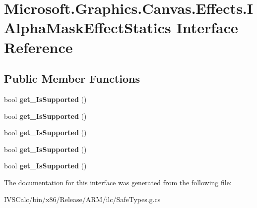\hypertarget{interface_microsoft_1_1_graphics_1_1_canvas_1_1_effects_1_1_i_alpha_mask_effect_statics}{}\section{Microsoft.\+Graphics.\+Canvas.\+Effects.\+I\+Alpha\+Mask\+Effect\+Statics Interface Reference}
\label{interface_microsoft_1_1_graphics_1_1_canvas_1_1_effects_1_1_i_alpha_mask_effect_statics}
\subsection*{Public Member Functions}
\begin{DoxyCompactItemize}
\item 
\mbox{\label{interface_microsoft_1_1_graphics_1_1_canvas_1_1_effects_1_1_i_alpha_mask_effect_statics_acb549089ab206ae7df3adcf359040c3a}} 
bool {\bfseries get\+\_\+\+Is\+Supported} ()
\item 
\mbox{\label{interface_microsoft_1_1_graphics_1_1_canvas_1_1_effects_1_1_i_alpha_mask_effect_statics_acb549089ab206ae7df3adcf359040c3a}} 
bool {\bfseries get\+\_\+\+Is\+Supported} ()
\item 
\mbox{\label{interface_microsoft_1_1_graphics_1_1_canvas_1_1_effects_1_1_i_alpha_mask_effect_statics_acb549089ab206ae7df3adcf359040c3a}} 
bool {\bfseries get\+\_\+\+Is\+Supported} ()
\item 
\mbox{\label{interface_microsoft_1_1_graphics_1_1_canvas_1_1_effects_1_1_i_alpha_mask_effect_statics_acb549089ab206ae7df3adcf359040c3a}} 
bool {\bfseries get\+\_\+\+Is\+Supported} ()
\item 
\mbox{\label{interface_microsoft_1_1_graphics_1_1_canvas_1_1_effects_1_1_i_alpha_mask_effect_statics_acb549089ab206ae7df3adcf359040c3a}} 
bool {\bfseries get\+\_\+\+Is\+Supported} ()
\end{DoxyCompactItemize}


The documentation for this interface was generated from the following file\+:\begin{DoxyCompactItemize}
\item 
I\+V\+S\+Calc/bin/x86/\+Release/\+A\+R\+M/ilc/Safe\+Types.\+g.\+cs\end{DoxyCompactItemize}
